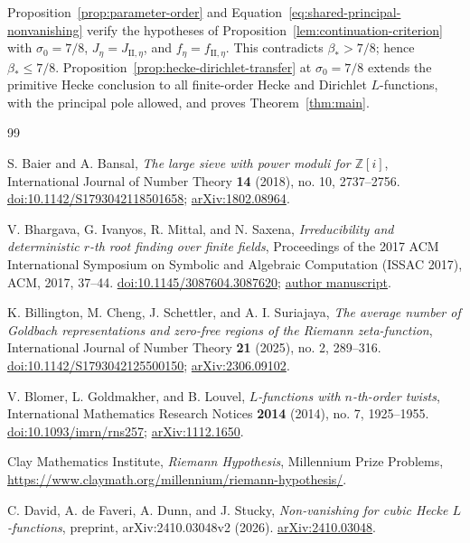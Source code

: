 \documentclass[11pt,a4paper]{article}
\numberwithin{equation}{section}
\numberwithin{figure}{section}
\theoremstyle{definition}
\theoremstyle{remark}
\begin{document}
Proposition~\ref{prop:parameter-order} and
Equation~\eqref{eq:shared-principal-nonvanishing} verify the hypotheses of
Proposition~\ref{lem:continuation-criterion} with
\(\sigma_0=7/8\), \(J_\eta=J_{\mathrm{II},\eta}\), and
\(f_\eta=f_{\mathrm{II},\eta}\).  This contradicts \(\beta_*>7/8\);
hence \(\beta_*\le7/8\).  Proposition~\ref{prop:hecke-dirichlet-transfer}
at \(\sigma_0=7/8\) extends the primitive Hecke conclusion to all
finite-order Hecke and Dirichlet \(L\)-functions, with the principal pole
allowed, and proves Theorem~\ref{thm:main}.
\begin{thebibliography}{99}

S. Baier and A. Bansal,
\emph{The large sieve with power moduli for $\mathbb Z[i]$},
International Journal of Number Theory \textbf{14} (2018), no. 10,
2737--2756.
\href{https://doi.org/10.1142/S1793042118501658}{doi:10.1142/S1793042118501658};
\href{https://arxiv.org/abs/1802.08964}{arXiv:1802.08964}.

V. Bhargava, G. Ivanyos, R. Mittal, and N. Saxena,
\emph{Irreducibility and deterministic $r$-th root finding over finite fields},
Proceedings of the 2017 ACM International Symposium on Symbolic and
Algebraic Computation (ISSAC 2017), ACM, 2017, 37--44.
\href{https://doi.org/10.1145/3087604.3087620}{doi:10.1145/3087604.3087620};
\href{https://www.cse.iitk.ac.in/users/nitin/papers/irred-and-rth-root.pdf}{author manuscript}.

K. Billington, M. Cheng, J. Schettler, and A. I. Suriajaya,
\emph{The average number of Goldbach representations and zero-free regions
of the Riemann zeta-function},
International Journal of Number Theory \textbf{21} (2025), no. 2, 289--316.
\href{https://doi.org/10.1142/S1793042125500150}{doi:10.1142/S1793042125500150};
\href{https://arxiv.org/abs/2306.09102}{arXiv:2306.09102}.

V. Blomer, L. Goldmakher, and B. Louvel,
\emph{$L$-functions with $n$-th-order twists},
International Mathematics Research Notices \textbf{2014} (2014), no. 7,
1925--1955.
\href{https://doi.org/10.1093/imrn/rns257}{doi:10.1093/imrn/rns257};
\href{https://arxiv.org/abs/1112.1650}{arXiv:1112.1650}.

Clay Mathematics Institute,
\emph{Riemann Hypothesis}, Millennium Prize Problems,
\url{https://www.claymath.org/millennium/riemann-hypothesis/}.

C. David, A. de Faveri, A. Dunn, and J. Stucky,
\emph{Non-vanishing for cubic Hecke $L$-functions},
preprint, arXiv:2410.03048v2 (2026).
\href{https://arxiv.org/abs/2410.03048}{arXiv:2410.03048}.


\end{thebibliography}
\end{document}
